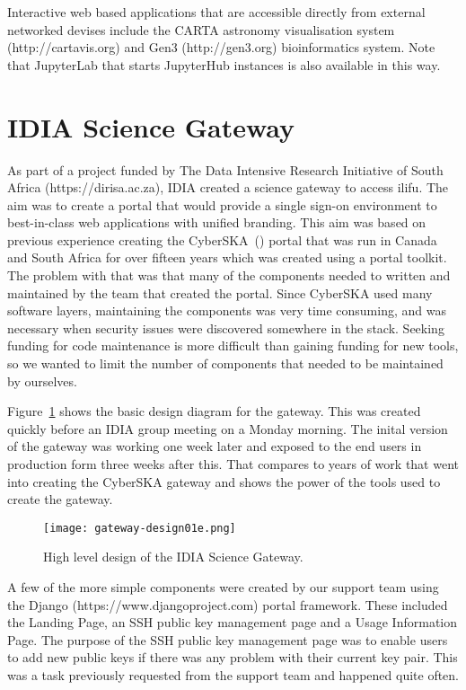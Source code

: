 \documentclass{iau_FM}
\begin{document}
Interactive web based applications that are accessible directly from external networked devises include
the CARTA astronomy visualisation system (http://cartavis.org) and Gen3 (http://gen3.org) bioinformatics system. 
Note that JupyterLab that starts
JupyterHub instances is also available in this way.


\section{IDIA Science Gateway}
\label{sec:gateway}

As part of a project funded by The Data Intensive Research Initiative of South Africa (https://dirisa.ac.za), 
IDIA created a science gateway to access {\sc ilifu}. The aim was to create
a portal that would provide a single sign-on environment to best-in-class web applications with unified branding. 
This aim was based on 
previous experience creating the CyberSKA~(\cite{cyberska}) portal that was run in
 Canada and South Africa for over fifteen 
years which
was created using a portal toolkit. The problem with that was that many of the components needed to written and maintained
by the team that created the portal. Since CyberSKA used many software 
layers, maintaining the components was very time consuming, and was necessary when security issues were discovered
somewhere in the stack.
Seeking funding for code maintenance is more difficult than gaining funding 
for new tools, so we wanted to limit the number of
components that needed to be maintained by ourselves.

Figure~\ref{fig:gateway_design} shows the basic design diagram for the gateway. This was created
quickly before an IDIA group meeting on a Monday morning. The inital version of the gateway was working one week later and
exposed to the end users in production form three weeks after this. That compares to years of work that went
 into creating the CyberSKA gateway
and shows the power of the tools used to create the gateway.

\begin{figure}
    \centering
    \texttt{[image: gateway-design01e.png]}
    \caption{High level design of the IDIA Science Gateway.}
    \label{fig:gateway_design}
\end{figure}

A few of the more simple components were created by our support team using the Django 
(https://www.djangoproject.com)
portal framework.
These included the Landing Page, an SSH public 
key management page and a Usage Information
Page. The purpose of the SSH public key management page was to enable users to add new public keys if
there was any problem with their current key pair. This was a task previously requested from the
support team and happened quite often.
\end{document}
